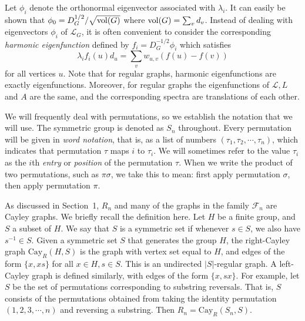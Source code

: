 Let $\phi_i$ denote the orthonormal eigenvector associated with $\lambda_i$.  It can easily be shown that
$\phi_0 = D_G^{1/2}/\sqrt{{\rm vol}(G)}$ where ${\rm vol}(G)=\sum_v d_v$.
Instead of dealing with eigenvectors $\phi_i$ of $\mathcal{L}_G$, it is often convenient to consider
the corresponding
\textit{harmonic eigenfunction} defined by $f_i = D_G^{-1/2} \phi_i$ which satisfies
\[  \lambda_i f_i(u)d_u= \sum_{v} w_{u,v} (f(u)-f(v))  \]
for all vertices $u$.  Note that for regular graphs, 
harmonic eigenfunctions are exactly eigenfunctions.
Moreover, for regular graphs the eigenfunctions of $\mathcal{L}, L$
and $A$ are the same, and the corresponding spectra are translations of each other.




We will frequently deal with permutations, so we establish
the notation that we will use.  The symmetric group is denoted as $S_n$
throughout.  Every permutation will be given in \textit{word notation}, 
that is, as a list of numbers $(\tau_1, \tau_2, \cdots, \tau_n)$, which indicates
that permutation $\tau$ maps $i$ to $\tau_i$.  We will sometimes refer to the 
value $\tau_i$ as the $i$th \textit{entry} or \textit{position} of the permutation $\tau$.
When we write the product
of two permutations, such as $\pi \sigma$, we take this to mean: first apply
permutation $\sigma$, then apply permutation $\pi$.


As discussed in Section~1, $R_n$ and many of the graphs in 
the family $\mathcal{F}_n$ are Cayley
graphs.  We briefly recall the definition here.  Let $H$ be a finite group, and 
$S$ a subset of $H$.  We say that $S$ is a symmetric set if whenever $s \in S$, 
we also have $s^{-1} \in S$.  Given a symmetric set $S$ that generates the 
group $H$, the right-Cayley graph $\text{Cay}_R(H,S)$ is the graph with vertex set
equal to $H$, and edges of the form $\{x, xs\}$ for all $x \in H, s \in S$.
This is an undirected $|S|$-regular graph. A left-Cayley graph is defined similarly,
with edges of the form $\{x,sx\}$.  For example, let $S$ be the set of
permutations corresponding to substring reversals.  That is, $S$ consists of 
the 
permutations obtained from taking the identity permutation 
$(1, 2, 3, \cdots, n)$ and reversing a substring.  Then 
$R_n = \text{Cay}_R(S_n,S)$.

